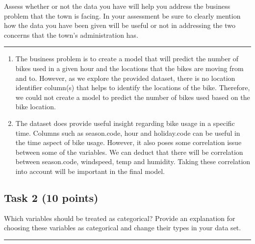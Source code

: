 \documentclass[
]{article}
\begin{document}
Assess whether or not the data you have will help you address the
business problem that the town is facing. In your assessment be sure to
clearly mention how the data you have been given will be useful or not
in addressing the two concerns that the town's administration has.

\begin{center}\rule{0.5\linewidth}{0.5pt}\end{center}

\begin{enumerate}
\def\labelenumi{\arabic{enumi}.}
\item
  The business problem is to create a model that will predict the number
  of bikes used in a given hour and the locations that the bikes are
  moving from and to. However, as we explore the provided dataset, there
  is no location identifier column(s) that helps to identify the
  locations of the bike. Therefore, we could not create a model to
  predict the number of bikes used based on the bike location.
\item
  The dataset does provide useful insight regarding bike usage in a
  specific time. Columns such as season.code, hour and holiday.code can
  be useful in the time aspect of bike usage. However, it also poses
  some correlation issue between some of the variables. We can deduct
  that there will be correlation between season.code, windspeed, temp
  and humidity. Taking these correlation into account will be important
  in the final model.
\end{enumerate}

\hypertarget{task-2-10-points}{%
\subsection{Task 2 (10 points)}\label{task-2-10-points}}

Which variables should be treated as categorical? Provide an explanation
for choosing these variables as categorical and change their types in
your data set.

\begin{center}\rule{0.5\linewidth}{0.5pt}\end{center}
\end{document}
